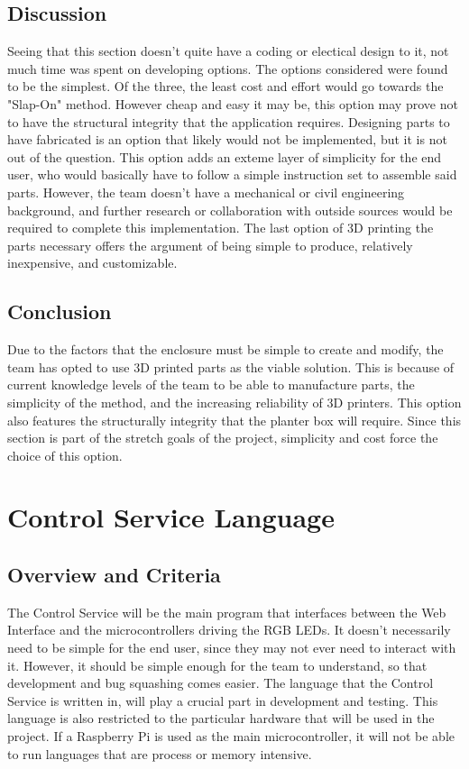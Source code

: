 	\subsection{Discussion}
	Seeing that this section doesn't quite have a coding or electical design to it, not much time was spent on developing options.  The options considered were found to be the
	simplest.  Of the three, the least cost and effort would go towards the "Slap-On" method.  However cheap and easy it may be, this option may prove not to have the structural
	integrity that the application requires.  Designing parts to have fabricated is an option that likely would not be implemented, but it is not out of the question.  This option
	adds an exteme layer of simplicity for the end user, who would basically have to follow a simple instruction set to assemble said parts.  However, the team doesn't have a
	mechanical or civil engineering background, and further research or collaboration with outside sources would be required to complete this implementation.  The last option of
	3D printing the parts necessary offers the argument of being simple to produce, relatively inexpensive, and customizable.

	\subsection{Conclusion}
	Due to the factors that the enclosure must be simple to create and modify, the team has opted to use 3D printed parts as the viable solution.  This is because of current knowledge
	levels of the team to be able to manufacture parts, the simplicity of the method, and the increasing reliability of 3D printers.  This option also features the structurally integrity
	that the planter box will require.  Since this section is part of the stretch goals of the project, simplicity and cost force the choice of this option.

	\newpage %

	\section{Control Service Language}

		\subsection{Overview and Criteria}
		The Control Service will be the main program that interfaces between the Web Interface and the microcontrollers driving the RGB LEDs.  It doesn't necessarily need to be simple
		for the end user, since they may not ever need to interact with it.  However, it should be simple enough for the team to understand, so that development and bug squashing comes
		easier.  The language that the Control Service is written in, will play a crucial part in development and testing.  This language is also restricted to the particular hardware
		that will be used in the project.  If a Raspberry Pi is used as the main microcontroller, it will not be able to run languages that are process or memory intensive.

